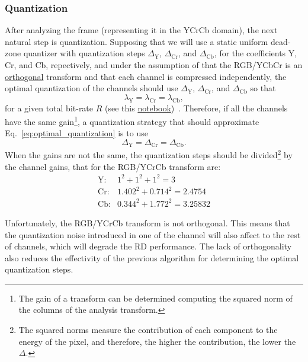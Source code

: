 \subsubsection{Quantization}
After analyzing the frame (representing it in the YCrCb domain), the
next natural step is quantization. Supposing that we will use a static
uniform dead-zone quantizer with quantization steps
$\Delta_{\text{Y}}$, $\Delta_{\text{Cr}}$, and $\Delta_{\text{Cb}}$,
for the coefficients Y, Cr, and Cb, repectively, and under the
assumption of that the RGB/YCbCr is an
\href{https://en.wikipedia.org/wiki/Orthogonality}{orthogonal}
transform and that each channel is compressed independently, the
optimal quantization of the channels should use $\Delta_{\text{Y}}$,
$\Delta_{\text{Cr}}$, and $\Delta_{\text{Cb}}$ so that
\begin{equation}
  \lambda_{\text{Y}} = \lambda_{\text{Cr}} = \lambda_{\text{Cb}},
  \label{eq:optimal_quantization}
\end{equation}
for a given total bit-rate $R$ (see this
\href{https://github.com/Sistemas-Multimedia/Sistemas-Multimedia.github.io/blob/master/study_guide/06-color_transform/performance.ipynb}{notebook})~\cite{vetterli1995wavelets,sayood2017introduction}. Therefore,
if all the channels have the same gain\footnote{The gain of a
transform can be determined computing the squared norm of the columns
of the analysis transform.}, a quantization strategy that should
approximate Eq.~\ref{eq:optimal_quantization} is to use
\begin{equation}
  \Delta_{\text{Y}} = \Delta_{\text{Cr}} = \Delta_{\text{Cb}}.
  \label{eq:simple_Q}
\end{equation}
When the gains are not the same, the quantization steps should be
divided\footnote{The squared norms measure the contribution of each
component to the energy of the pixel, and therefore, the higher the
contribution, the lower the $\Delta$.} by the channel gains, that for
the RGB/YCrCb transform are:
\begin{equation*}
  \begin{array}{rl}
    \text{Y}: & 1^2 + 1^2 + 1^2 = 3\\
    \text{Cr}: & 1.402^2 + 0.714^2 = 2.4754\\
    \text{Cb}: & 0.344^2 + 1.772^2 = 3.25832
  \end{array}
\end{equation*}

Unfortunately, the RGB/YCrCb transform is not orthogonal. This
means that the quantization noise introduced in one of the channel
will also affect to the rest of channels, which will degrade the RD
performance. The lack of orthogonality also reduces the effectivity of
the previous algorithm for determining the optimal quantization steps.

